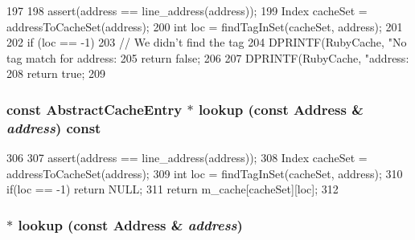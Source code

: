\begin{DoxyCode}
197 {
198     assert(address == line_address(address));
199     Index cacheSet = addressToCacheSet(address);
200     int loc = findTagInSet(cacheSet, address);
201 
202     if (loc == -1) {
203         // We didn't find the tag
204         DPRINTF(RubyCache, "No tag match for address: %
205         return false;
206     }
207     DPRINTF(RubyCache, "address: %
208     return true;
209 }
\end{DoxyCode}
\hypertarget{classCacheMemory_a28b926de4d910367b746eb67d244f250}{
\subsubsection[{lookup}]{\setlength{\rightskip}{0pt plus 5cm}const {\bf AbstractCacheEntry} $\ast$ lookup (const {\bf Address} \& {\em address}) const}}
\label{classCacheMemory_a28b926de4d910367b746eb67d244f250}



\begin{DoxyCode}
306 {
307     assert(address == line_address(address));
308     Index cacheSet = addressToCacheSet(address);
309     int loc = findTagInSet(cacheSet, address);
310     if(loc == -1) return NULL;
311     return m_cache[cacheSet][loc];
312 }
\end{DoxyCode}
\hypertarget{classCacheMemory_a0c6ae9fa65dfd9c0786e2e5a39be4a1e}{
\subsubsection[{lookup}]{ $\ast$ lookup (const {\bf Address} \& {\em address})}}
\label{classCacheMemory_a0c6ae9fa65dfd9c0786e2e5a39be4a1e}



